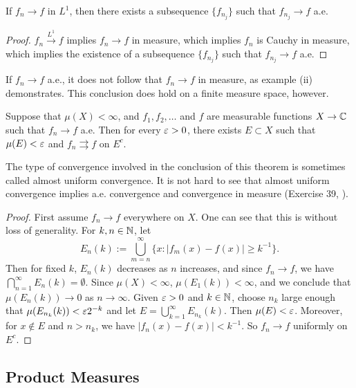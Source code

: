 \documentclass[12pt]{article} %
\begin{document}
\begin{corollary}
    If $f_n \to f$ in $L^1$, then there exists a subsequence $\{f_{n_j}\}$ such that $f_{n_j} \to f$ a.e.
\end{corollary}

\begin{proof}
    $f_n \overset{L^1}{\to} f$ implies $f_n \to f$ in measure, which implies $f_n$ is Cauchy in measure, which implies the existence of a subsequence $\{f_{n_j}\}$ such that $f_{n_j} \to f$ a.e.
\end{proof}

If $f_n \to f$ a.e., it does not follow that $f_n \to f$ in measure, as example (ii) demonstrates. This conclusion does hold on a finite measure space, however.

\begin{theorem}[Egoroff]
    Suppose that $\mu(X) < \infty$, and $f_1, f_2, \ldots$ and $f$ are measurable functions $X \to \mathbb{C}$ such that $f_n \to f$ a.e. Then for every $\varepsilon > 0$, there exists $E \subset X$ such that $\mu(E) < \varepsilon$ and $f_n \rightrightarrows f$ on $E^c$.
\end{theorem}

\noindent The type of convergence involved in the conclusion of this theorem is sometimes called almost uniform convergence. It is not hard to see that almost uniform convergence implies a.e. convergence and convergence in measure (Exercise 39, ).

\begin{proof}
    First assume $f_n \to f$ everywhere on $X$. One can see that this is without loss of generality. For $k, n \in \mathbb{N}$, let \[E_n(k) := \bigcup_{m=n}^{\infty} \{x : |f_m(x) - f(x)| \geq k^{-1}\}.\]
    Then for fixed $k$, $E_n(k)$ decreases as $n$ increases, and since $f_n \to f$, we have $\bigcap_{n=1}^{\infty} E_n(k) = \emptyset$. Since $\mu(X) < \infty$, $\mu(E_1(k)) < \infty$, and we conclude that $\mu(E_n(k)) \to 0$ as $n \to \infty$. Given $\varepsilon > 0$ and $k \in \mathbb{N}$, choose $n_k$ large enough that $\mu(E_{n_k}(k)) < \varepsilon 2^{-k}$ and let $E = \bigcup_{k=1}^{\infty} E_{n_k}(k)$. Then $\mu(E) < \varepsilon$. Moreover, for $x \notin E$ and $n > n_k$, we have $|f_n(x) - f(x)| < k^{-1}$. So $f_n \to f$ uniformly on $E^c$.
\end{proof}

\subsection{Product Measures}
\end{document}
